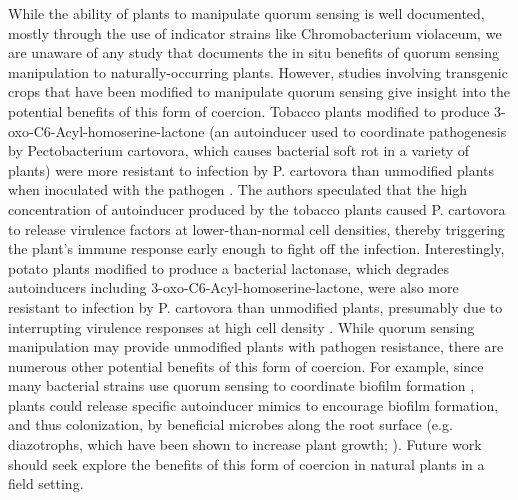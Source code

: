 \documentclass[PhD]{msu-thesis}
\begin{document}
While the ability of plants to manipulate quorum sensing is well documented, mostly through the use of indicator strains like Chromobacterium violaceum, we are unaware of any study that documents the in situ benefits of quorum sensing manipulation to naturally-occurring plants. However, studies involving transgenic crops that have been modified to manipulate quorum sensing give insight into the potential benefits of this form of coercion. Tobacco plants modified to produce 3-oxo-C6-Acyl-homoserine-lactone (an autoinducer used to coordinate pathogenesis by Pectobacterium cartovora, which causes bacterial soft rot in a variety of plants) were more resistant to infection by P. cartovora than unmodified plants when inoculated with the pathogen \cite{mae2001}. The authors speculated that the high concentration of autoinducer produced by the tobacco plants caused P. cartovora to release virulence factors at lower-than-normal cell densities, thereby triggering the plant’s immune response early enough to fight off the infection. Interestingly, potato plants modified to produce a bacterial lactonase, which degrades autoinducers including 3-oxo-C6-Acyl-homoserine-lactone, were also more resistant to infection by P. cartovora than unmodified plants, presumably due to interrupting virulence responses at high cell density \cite{dong2001}. While quorum sensing manipulation may provide unmodified plants with pathogen resistance, there are numerous other potential benefits of this form of coercion. For example, since many bacterial strains use quorum sensing to coordinate biofilm formation \cite{bassler1999}, plants could release specific autoinducer mimics to encourage biofilm formation, and thus colonization, by beneficial microbes along the root surface (e.g. diazotrophs, which have been shown to increase plant growth; \cite{norman2017}). Future work should seek explore the benefits of this form of coercion in natural plants in a field setting.
\end{document}
